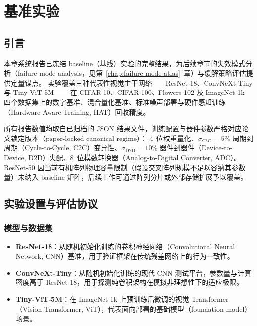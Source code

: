 \chapter{基准实验}
\label{chap:benchmarks}

\section{引言}

本章系统报告已冻结 baseline（基线）实验的完整结果，为后续章节的失效模式分析（failure mode analysis，见第~\ref{chap:failure-mode-atlas}~章）与缓解策略评估提供定量锚点。
实验覆盖三种代表性视觉主干网络——ResNet-18、ConvNeXt-Tiny 与 Tiny-ViT-5M——
在 CIFAR-10、CIFAR-100、Flowers-102 及 ImageNet-1k 四个数据集上的数字基准、混合量化基准、标准噪声部署与硬件感知训练（Hardware-Aware Training, HAT）回收精度。

所有报告数值均取自已归档的 JSON 结果文件，训练配置与器件参数严格对应论文锁定版本（paper-locked canonical regime）：
4~位权重量化、$\sigma_{\mathrm{C2C}}=5\%$ 周期到周期（Cycle-to-Cycle, C2C）变异性、$\sigma_{\mathrm{D2D}}=10\%$ 器件到器件（Device-to-Device, D2D）失配、8~位模数转换器（Analog-to-Digital Converter, ADC）。
ResNet-50 因当前有机阵列物理容量限制（假设交叉阵列规模不足以容纳其参数量）未纳入 baseline 矩阵，后续工作可通过阵列分片或外部存储扩展予以覆盖。

\section{实验设置与评估协议}

\subsection{模型与数据集}

\begin{itemize}
    \item \textbf{ResNet-18}：从随机初始化训练的卷积神经网络（Convolutional Neural Network, CNN）基准，用于验证框架在传统残差网络上的行为一致性。
    \item \textbf{ConvNeXt-Tiny}：从随机初始化训练的现代 CNN 测试平台，参数量与计算密度高于 ResNet-18，用于探测纯卷积架构在模拟非理想性下的适应极限。
    \item \textbf{Tiny-ViT-5M}：在 ImageNet-1k 上预训练后微调的视觉 Transformer（Vision Transformer, ViT），代表面向部署的基础模型（foundation model）场景。
\end{itemize}

